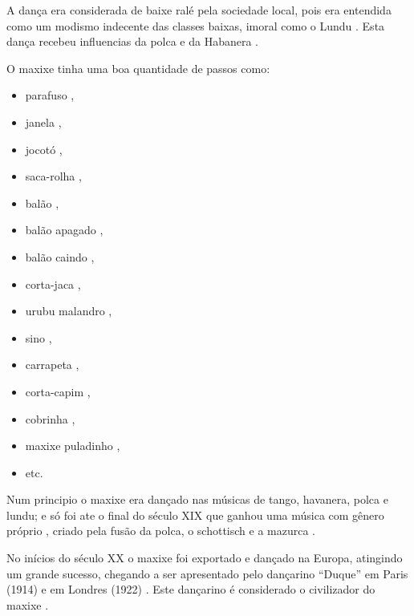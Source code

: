 A dança era considerada de baixe ralé pela sociedade local, 
pois era entendida como um modismo indecente das classes baixas, imoral como o Lundu \cite[pp. 198]{dourado2004dicionario}.
Esta dança recebeu influencias da polca \cite[pp. 198]{dourado2004dicionario} e 
da Habanera \cite[pp. 62]{reinato2010musica}.


O maxixe tinha uma boa quantidade de passos como: 
\begin{itemize} 
\item parafuso  \cite[pp. 68, 93, 129]{efege1974maxixe} \cite[pp. 465]{marcondes1977enciclopedia} \cite[pp. 62]{tinhorao1986pequena}, 
\item janela  \cite[pp. 129]{efege1974maxixe},
\item jocotó \cite[pp. 83, 96, 173]{efege1974maxixe},
\item saca-rolha \cite[pp. 465]{marcondes1977enciclopedia}, 
\item balão \cite[pp. 93]{efege1974maxixe} \cite[pp. 465]{marcondes1977enciclopedia}, 
\item balão apagado \cite[pp. 68]{efege1974maxixe} \cite[aproximadamente min. 11:35]{MaxixeDocumentario1},
\item balão caindo  \cite[pp. 129, 131]{efege1974maxixe} \cite[pp. 62]{tinhorao1986pequena},
\item corta-jaca  \cite[pp. 131]{efege1974maxixe},
\item urubu malandro  \cite[pp. 131]{efege1974maxixe},
\item sino \cite[pp. 68]{efege1974maxixe}, 
\item carrapeta  \cite[pp. 465]{marcondes1977enciclopedia}, 
\item corta-capim \cite[pp. 465]{marcondes1977enciclopedia} \cite[pp. 62]{tinhorao1986pequena}, 
\item cobrinha \cite[pp. 62]{tinhorao1986pequena},
\item maxixe puladinho \cite[pp. 177]{1920revista},
\item etc. 
\end{itemize}
Num principio o maxixe era dançado nas músicas de tango, havanera, polca e lundu; 
e só foi ate o final do século XIX que ganhou uma música com gênero próprio \cite[pp. 465]{marcondes1977enciclopedia},
criado pela fusão da polca, o schottisch e a mazurca \cite[pp. 58]{tinhorao1986pequena}.

No inícios do século XX o maxixe foi exportado e dançado na Europa, atingindo um grande sucesso, 
chegando a ser apresentado pelo dançarino ``Duque'' em Paris (1914) e em Londres (1922) \cite[pp. 465]{marcondes1977enciclopedia}.
Este dançarino é considerado o civilizador do maxixe \cite[pp. 129]{efege1974maxixe}.

